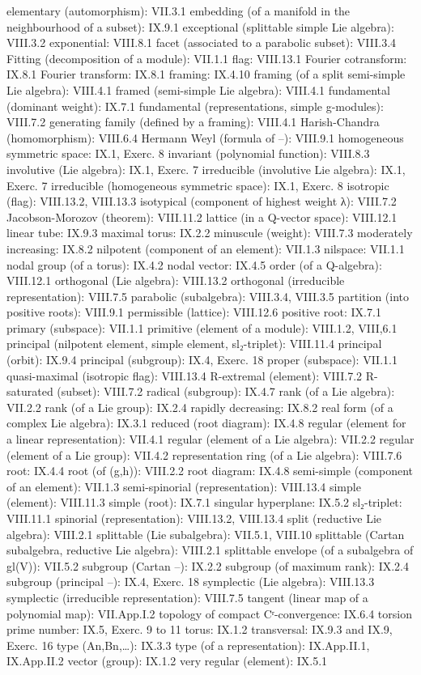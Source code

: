 elementary (automorphism): VII.3.1 embedding (of a manifold in the neighbourhood of a subset): IX.9.1 exceptional (splittable simple Lie algebra): VIII.3.2 exponential: VIII.8.1 facet (associated to a parabolic subset): VIII.3.4 Fitting (decomposition of a module): VII.1.1 flag: VIII.13.1 Fourier cotransform: IX.8.1 Fourier transform: IX.8.1 framing: IX.4.10 framing (of a split semi-simple Lie algebra): VIII.4.1 framed (semi-simple Lie algebra): VIII.4.1 fundamental (dominant weight): IX.7.1 fundamental (representations, simple g-modules): VIII.7.2 generating family (defined by a framing): VIII.4.1 Harish-Chandra (homomorphism): VIII.6.4 Hermann Weyl (formula of --): VIII.9.1 homogeneous symmetric space: IX.1, Exerc. 8 invariant (polynomial function): VIII.8.3 involutive (Lie algebra): IX.1, Exerc. 7 irreducible (involutive Lie algebra): IX.1, Exerc. 7 irreducible (homogeneous symmetric space): IX.1, Exerc. 8 isotropic (flag): VIII.13.2, VIII.13.3 isotypical (component of highest weight λ): VIII.7.2 Jacobson-Morozov (theorem): VIII.11.2 lattice (in a Q-vector space): VIII.12.1 linear tube: IX.9.3 maximal torus: IX.2.2 minuscule (weight): VIII.7.3 moderately increasing: IX.8.2 nilpotent (component of an element): VII.1.3 nilspace: VII.1.1 nodal group (of a torus): IX.4.2 nodal vector: IX.4.5 order (of a Q-algebra): VIII.12.1 orthogonal (Lie algebra): VIII.13.2 orthogonal (irreducible representation): VIII.7.5 parabolic (subalgebra): VIII.3.4, VIII.3.5 partition (into positive roots): VIII.9.1 permissible (lattice): VIII.12.6 positive root: IX.7.1 primary (subspace): VII.1.1 primitive (element of a module): VIII.1.2, VIII,6.1 principal (nilpotent element, simple element, sl₂-triplet): VIII.11.4 principal (orbit): IX.9.4 principal (subgroup): IX.4, Exerc. 18 proper (subspace): VII.1.1 quasi-maximal (isotropic flag): VIII.13.4 R-extremal (element): VIII.7.2 R-saturated (subset): VIII.7.2 radical (subgroup): IX.4.7 rank (of a Lie algebra): VII.2.2 rank (of a Lie group): IX.2.4 rapidly decreasing: IX.8.2 real form (of a complex Lie algebra): IX.3.1 reduced (root diagram): IX.4.8 regular (element for a linear representation): VII.4.1 regular (element of a Lie algebra): VII.2.2 regular (element of a Lie group): VII.4.2 representation ring (of a Lie algebra): VIII.7.6 root: IX.4.4 root (of (g,h)): VIII.2.2 root diagram: IX.4.8 semi-simple (component of an element): VII.1.3 semi-spinorial (representation): VIII.13.4 simple (element): VIII.11.3 simple (root): IX.7.1 singular hyperplane: IX.5.2 sl₂-triplet: VIII.11.1 spinorial (representation): VIII.13.2, VIII.13.4 split (reductive Lie algebra): VIII.2.1 splittable (Lie subalgebra): VII.5.1, VIII.10 splittable (Cartan subalgebra, reductive Lie algebra): VIII.2.1 splittable envelope (of a subalgebra of gl(V)): VII.5.2 subgroup (Cartan --): IX.2.2 subgroup (of maximum rank): IX.2.4 subgroup (principal --): IX.4, Exerc. 18 symplectic (Lie algebra): VIII.13.3 symplectic (irreducible representation): VIII.7.5 tangent (linear map of a polynomial map): VII.App.I.2 topology of compact Cʳ-convergence: IX.6.4 torsion prime number: IX.5, Exerc. 9 to 11 torus: IX.1.2 transversal: IX.9.3 and IX.9, Exerc. 16 type (An,Bn,\ldots): IX.3.3 type (of a representation): IX.App.II.1, IX.App.II.2 vector (group): IX.1.2 very regular (element): IX.5.1

